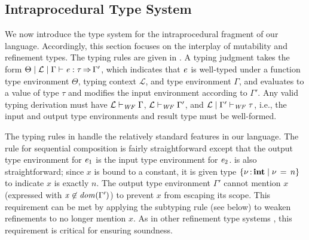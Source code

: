 
\subsection{Intraprocedural Type System}
\label{sec:intra-types}
We now introduce the type system for the intraprocedural fragment of
our language. Accordingly, this section focuses on the interplay of
mutability and refinement types. The typing rules are given in
.  
A typing judgment takes the
form $ \Theta   \mid   \mathcal{L}   \mid   \Gamma   \vdash   \mathit{e}  :  \tau   \operatorname{\Rightarrow}   \Gamma' $, which indicates that $\mathit{e}$
is well-typed under a function type
environment $\Theta$, typing context $\mathcal{L}$, and type environment $\Gamma$, 
and evaluates to a value of type $\tau$ and modifies the input environment
according to $\Gamma'$. Any valid typing derivation must
have $ \mathcal{L}   \vdash _{\mathit{WF}}  \Gamma $, $ \mathcal{L}   \vdash _{\mathit{WF}}  \Gamma' $, and $ \mathcal{L}   \mid   \Gamma'   \vdash _{\mathit{WF}}  \tau $, i.e.,
the input and output type environments and result type must
be well-formed.

The typing rules in  handle the relatively
standard features in our language. The rule  for sequential
composition is fairly straightforward except that the output type
environment for $\mathit{e_{{\mathrm{1}}}}$ is the input type environment for $\mathit{e_{{\mathrm{2}}}}$.
 is also straightforward; since $\mathit{x}$ is bound to a
constant, it is given type $ \left\{{  \nu  \operatorname{:} \mathbf{int} \mid  \nu \, = \, n }\right\} $ to indicate $\mathit{x}$ is
exactly $n$.  The output type environment $\Gamma'$ cannot mention
$\mathit{x}$ (expressed with $ \mathit{x}  \not\in   \mathit{dom}( \Gamma' )  $)
to prevent $\mathit{x}$ from escaping its scope.  This requirement
can be met by applying the subtyping rule (see below) to weaken
refinements to no longer mention $\mathit{x}$. As in other refinement type
systems \cite{rondon2008liquid}, this requirement is critical for
ensuring soundness.

